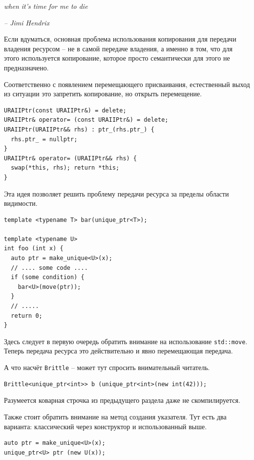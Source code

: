 \documentclass[a4paper,12pt,oneside]{article}
\begin{document}
\hfill\textit{when it's time for me to die}{\vspace{0.5em}}

\hfill\textit{-- Jimi Hendrix}

Если вдуматься, основная проблема использования копирования для передачи владения ресурсом -- не в самой передаче владения, а именно в том, что для этого используется копирование, которое просто семантически для этого не предназначено.

Соответственно с появлением перемещающего присваивания, естественный выход из ситуации это запретить копирование, но открыть перемещение.

\begin{lstlisting}
URAIIPtr(const URAIIPtr&) = delete;
URAIIPtr& operator= (const URAIIPtr&) = delete;
URAIIPtr(URAIIPtr&& rhs) : ptr_(rhs.ptr_) { 
  rhs.ptr_ = nullptr; 
} 
URAIIPtr& operator= (URAIIPtr&& rhs) { 
  swap(*this, rhs); return *this; 
}
\end{lstlisting}

Эта идея позволяет решить проблему передачи ресурса за пределы области видимости.

\begin{lstlisting}
template <typename T> bar(unique_ptr<T>);

template <typename U>
int foo (int x) {
  auto ptr = make_unique<U>(x);
  // .... some code ....
  if (some condition) {
    bar<U>(move(ptr));
  }
  // .....
  return 0;
}
\end{lstlisting}

Здесь следует в первую очередь обратить внимание на использование \lstinline!std::move!. Теперь передача ресурса это действительно и явно перемещающая передача.

А что насчёт \lstinline!Brittle! -- может тут спросить внимательный читатель.

\begin{lstlisting}
Brittle<unique_ptr<int>> b (unique_ptr<int>(new int(42)));
\end{lstlisting}

Разумеется коварная строчка из предыдущего раздела даже не скомпилируется.

Также стоит обратить внимание на метод создания указателя. Тут есть два варианта: классический через конструктор и использованный выше.

\begin{lstlisting}
auto ptr = make_unique<U>(x);
unique_ptr<U> ptr (new U(x));
\end{lstlisting}
\end{document}
